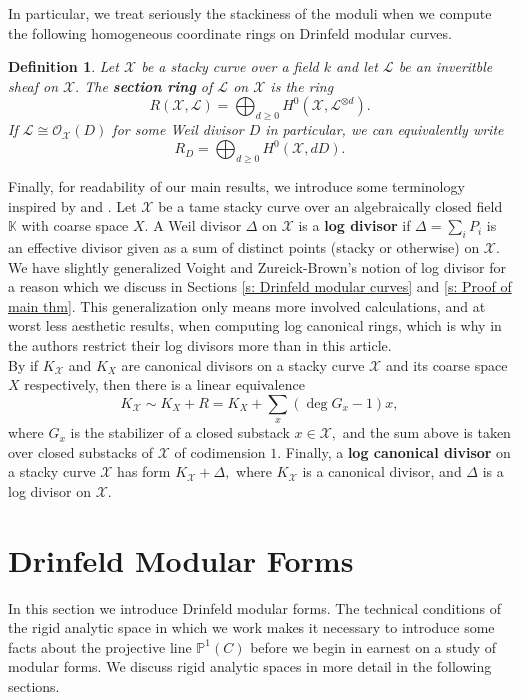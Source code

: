 \documentclass[11pt]{amsart}
\newtheorem{definition}[theorem]{Definition}
\theoremstyle{definition}
\numberwithin{equation}{section}
\newcommand{\cO}{\mathcal{O}}		%
\newcommand{\sL}{\mathscr{L}}		%
\newcommand{\sX}{\mathscr{X}}		%
\newcommand{\bbK}{\mathbb{K}}		%
\newcommand{\bbP}{\mathbb{P}}		%
\begin{document}
		In particular, we treat seriously the stackiness of the moduli when we compute the following homogeneous coordinate rings on Drinfeld modular curves.  
		\begin{definition}
			Let $\sX$ be a stacky curve over a field $k$ and let $\sL$ be an inveritble sheaf on $\sX.$ The \textbf{section ring} of $\sL$ on $\sX$ is the ring 
			\[R(\sX,\sL)=\bigoplus_{d\geq 0}H^0(\sX,\sL^{\otimes d}).\]
			If $\sL\cong \cO_{\sX}(D)$ for some Weil divisor $D$ in particular, we can equivalently write 
			\[R_D=\bigoplus_{d\geq 0}H^0(\sX,dD).
			\]
		\end{definition}		
		
		Finally, for readability of our main results, we introduce some terminology inspired by \cite[Definition $5.6.2$]{VZB} and \cite[Proposition $5.5.6$]{VZB}. Let $\sX$ be a tame stacky curve over an algebraically closed field $\bbK$ with coarse space $X.$ A Weil divisor $\Delta$ on $\sX$ is a \textbf{log divisor} if $\Delta=\sum_i P_i$ is an effective divisor given as a sum of distinct points (stacky or otherwise) on $\sX.$ We have slightly generalized Voight and Zureick-Brown's notion of log divisor for a reason which we discuss in Sections \ref{s: Drinfeld modular curves} and \ref{s: Proof of main thm}. This generalization only means more involved calculations, and at worst less aesthetic results, when computing log canonical rings, which is why in \cite[Remark $5.4.6$]{VZB} the authors restrict their log divisors more than in this article.\\ 
		
		By \cite[Proposition $5.5.6$]{VZB} if $K_{\sX}$ and $K_X$ are canonical divisors on a stacky curve $\sX$ and its coarse space $X$ respectively, then there is a linear equivalence
		\[K_{\sX}\sim K_X+R=K_X+\sum_x \left(\deg G_x-1\right)x,\]
		where $G_x$ is the stabilizer of a closed substack $x\in \sX,$ and the sum above is taken over closed substacks of $\sX$ of codimension $1.$ Finally, a \textbf{log canonical divisor} on a stacky curve $\sX$ has form $K_{\sX}+\Delta,$ where $K_{\sX}$ is a canonical divisor, and $\Delta$ is a log divisor on $\sX.$

		
		\section{Drinfeld Modular Forms}
		
		In this section we introduce Drinfeld modular forms. The technical conditions of the rigid analytic space in which we work makes it necessary to introduce some facts about the projective line $\bbP^1(C)$ before we begin in earnest on a study of modular forms. We discuss rigid analytic spaces in more detail in the following sections.
		
\end{document}
